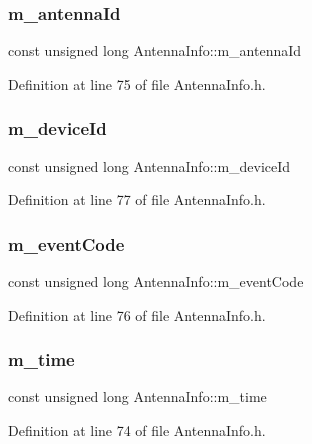\subsubsection{m\_antennaId}
{\footnotesize\ttfamily const unsigned long Antenna\+Info\+::m\+\_\+antenna\+Id\hspace{0.3cm}{\ttfamily [private]}}



Definition at line 75 of file Antenna\+Info.\+h.

\mbox{\label{class_antenna_info_a45534eaa11caaf9b1c944c09b2b4681e}} 
\subsubsection{m\_deviceId}
{\footnotesize\ttfamily const unsigned long Antenna\+Info\+::m\+\_\+device\+Id\hspace{0.3cm}{\ttfamily [private]}}



Definition at line 77 of file Antenna\+Info.\+h.

\mbox{\label{class_antenna_info_ac20796510cecac0bd44cfb31a23e0c21}} 
\subsubsection{m\_eventCode}
{\footnotesize\ttfamily const unsigned long Antenna\+Info\+::m\+\_\+event\+Code\hspace{0.3cm}{\ttfamily [private]}}



Definition at line 76 of file Antenna\+Info.\+h.

\mbox{\label{class_antenna_info_a53bdf455cb959afbed0a14bc5de385ed}} 
\subsubsection{m\_time}
{\footnotesize\ttfamily const unsigned long Antenna\+Info\+::m\+\_\+time\hspace{0.3cm}{\ttfamily [private]}}



Definition at line 74 of file Antenna\+Info.\+h.

